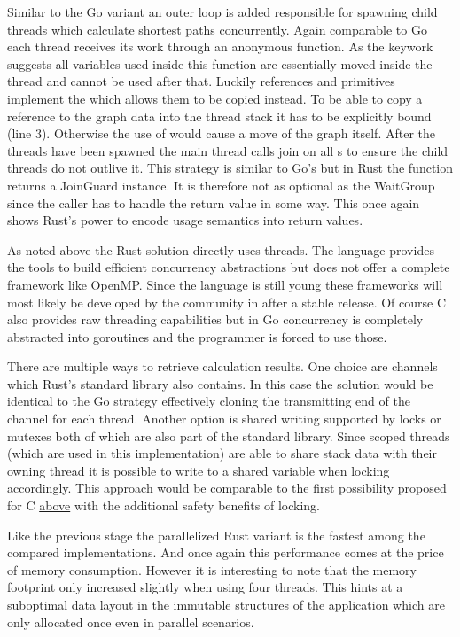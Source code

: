 Similar to the Go variant an outer loop is added responsible for spawning child threads which calculate shortest paths concurrently. Again comparable to Go each thread receives its work through an anonymous function. As the keywork  suggests all variables used inside this function are essentially moved inside the thread and cannot be used after that. Luckily references and primitives implement the  which allows them to be copied instead. To be able to copy a reference to the graph data into the thread stack it has to be explicitly bound (line 3). Otherwise the use of  would cause a move of the graph itself. After the threads have been spawned the main thread calls join on all s to ensure the child threads do not outlive it. This strategy is similar to Go's  but in Rust the  function returns a JoinGuard instance. It is therefore not as optional as the WaitGroup since the caller has to handle the return value in some way. This once again shows Rust's power to encode usage semantics into return values.

As noted above the Rust solution directly uses threads. The language provides the tools to build efficient concurrency abstractions but does not offer a complete framework like OpenMP. Since the language is still young these frameworks will most likely be developed by the community in after a stable release. Of course C also provides raw threading capabilities but in Go concurrency is completely abstracted into \glspl{goroutine} and the programmer is forced to use those.

There are multiple ways to retrieve calculation results. One choice are channels which Rust's standard library also contains. In this case the solution would be identical to the Go strategy effectively cloning the transmitting end of the channel for each thread. Another option is shared writing supported by locks or mutexes both of which are also part of the standard library. Since scoped threads (which are used in this implementation) are able to share stack data with their owning thread it is possible to write to a shared variable when locking accordingly. This approach would be comparable to the first possibility proposed for C \hyperref[subsec:Implementation::ParallelBenchmark::C]{above} with the additional safety benefits of locking.

Like the previous stage the parallelized Rust variant is the fastest among the compared implementations. And once again this performance comes at the price of memory consumption. However it is interesting to note that the memory footprint only increased slightly when using four threads. This hints at a suboptimal data layout in the immutable structures of the application which are only allocated once even in parallel scenarios.

